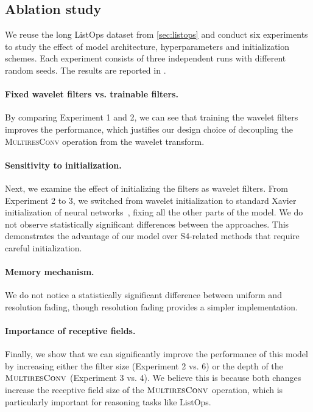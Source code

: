 \documentclass{article}
\theoremstyle{plain}
\theoremstyle{definition}
\theoremstyle{remark}
\newcommand{\prepar}{\vspace{-0.1in}}
\begin{document}
\subsection{Ablation study}
\label{sec:exp-ablation}

We reuse the long ListOps dataset from \cref{sec:listops} and conduct six experiments to study the effect of model architecture, hyperparameters and initialization schemes. 
Each experiment consists of three independent runs with different random seeds.
The results are reported in . 

\prepar
\paragraph{Fixed wavelet filters vs. trainable filters. } By comparing Experiment 1 and 2, we can see that training the wavelet filters improves the performance, which justifies our design choice of decoupling the \textsc{MultiresConv} operation from the wavelet transform. 

\prepar
\paragraph{Sensitivity to initialization. } 
Next, we examine the effect of initializing the filters as wavelet filters. 
From Experiment 2 to 3, we switched from wavelet initialization to standard Xavier initialization of neural networks~\citep{glorot2010understanding}, fixing all the other parts of the model. 
We do not observe statistically significant differences between the approaches. 
This demonstrates the advantage of our model over S4-related methods that require careful initialization. 

\prepar
\paragraph{Memory mechanism. } We do not notice a statistically significant difference between uniform and resolution fading, though resolution fading provides a simpler implementation.

\prepar
\paragraph{Importance of receptive fields. }
Finally, we show that we can significantly improve the performance of this model by increasing either the filter size (Experiment 2 vs. 6) or the depth of the $\textsc{MultiresConv}$ (Experiment 3 vs. 4). 
We believe this is because both changes increase the receptive field size of the $\textsc{MultiresConv}$ operation, which is particularly important for reasoning tasks like ListOps. 
\end{document}
